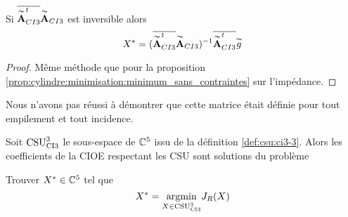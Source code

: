     \begin{prop}
      Si \(\conj{\tilde{\mA}_{CI3}^t}\tilde{\mA}_{CI3}\) est inversible alors
      \begin{equation*}
        X^* = (\conj{\tilde{\mA}_{CI3}^t}\tilde{\mA}_{CI3})^{-1}\conj{\tilde{\mA}_{CI3}^t}\tilde{g}
      \end{equation*}
    \end{prop}
    \begin{proof}
      Même méthode que pour la proposition \ref{prop:cylindre:minimisation:minimum_sans_contraintes} sur l'impédance.
    \end{proof}

    Nous n'avons pas réussi à démontrer que cette matrice était définie pour tout empilement et tout incidence.

    \begin{thm}

      Soit \(\CSU[3]{CI3}\) le sous-espace de \(\CC^5\) issu de la définition \ref{def:csu:ci3-3}.
      Alors les coefficients de la CIOE respectant les CSU sont solutions du problème

      Trouver \(X^* \in \CC^5\) tel que
      \begin{equation*}
        X^* = \argmin{X\in \CSU[3]{CI3}} J_R(X)
      \end{equation*}
    \end{thm}

    
